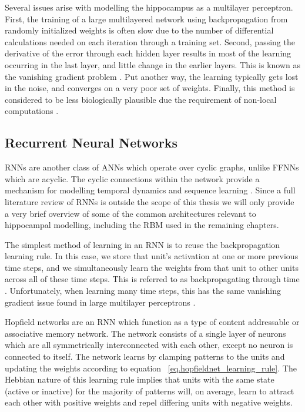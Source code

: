 Several issues arise with modelling the hippocampus as a multilayer perceptron.
First, the training of a large multilayered network  
using backpropagation from randomly initialized 
weights is often slow due to the number of differential calculations needed on each 
iteration through a training set. 
Second, passing the derivative of the error through each 
hidden layer results in most of the learning occurring in the last layer,
and little change in the earlier layers. 
This is known as the vanishing gradient problem \citep{vanishing_gradient}. 
Put another way, the learning typically gets lost in the noise, 
and converges on a very poor set of weights. 
Finally, this method is considered to be less biologically 
plausible due the requirement of non-local computations \citep{contrastive_learning}.

\subsection{Recurrent Neural Networks}

\Acp{RNN} are another class of \acp{ANN} which operate over cyclic graphs, 
unlike \acp{FFNN} which are acyclic. 
The cyclic connections within the network provide a 
mechanism for modelling temporal dynamics and sequence learning \citep{recurrent-nn-review}. 
Since a full literature review of \acp{RNN} is outside the scope of this thesis we 
will only provide a very brief overview of 
some of the common architectures relevant to hippocampal modelling, including the 
\ac{RBM} used in the remaining chapters.

The simplest method of learning in an \ac{RNN} is to reuse the backpropagation learning rule. 
In this case, we store that unit's activation at one or more previous time steps, 
and we simultaneously learn the weights from that unit to other units across all of these time steps.  
This is referred to as backpropagating through time \citep{backprop-time}. 
Unfortunately, when learning many time steps, this has the 
same vanishing gradient issue found in large multilayer perceptrons \citep{vanishing_gradient}.

Hopfield networks \citep{hopfield} are an \ac{RNN} which function as a type of 
content addressable or associative memory network. 
The network consists of a single 
layer of neurons which are all symmetrically interconnected with each other, except no 
neuron is connected to itself. 
The network learns by clamping patterns to the units and updating the weights 
according to equation ~\ref{eq.hopfieldnet_learning_rule}. 
The Hebbian nature of this learning rule implies 
that units with the same state (active or inactive) for the majority of patterns will, on average, 
learn to attract each other with positive 
weights and repel differing units with negative weights. 

